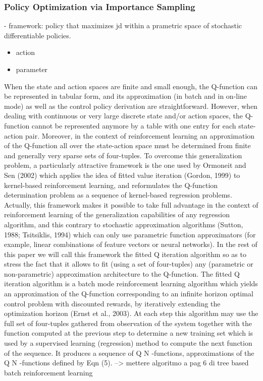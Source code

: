 \subsubsection{Policy Optimization via Importance Sampling}
\cite{pois}


- framework: policy that maximizes jd within a prametric space of stochastic differentiable policies.

\begin{itemize}
\item action
\item parameter
\end{itemize}




	When the state and action spaces are finite and small enough, the Q-function can be represented in tabular form, and its approximation (in batch and in on-line mode) as well as the control policy derivation are straightforward. However, when dealing with continuous or very large discrete state and/or action spaces, the Q-function cannot be represented anymore by a table with one entry for each state-action pair. Moreover, in the context of reinforcement learning an approximation of the Q-function all over the state-action space must be determined from finite and generally very sparse sets of four-tuples.
To overcome this generalization problem, a particularly attractive framework is the one used by Ormoneit and Sen (2002) which applies the idea of fitted value iteration (Gordon, 1999) to kernel-based reinforcement learning, and reformulates the Q-function determination problem as a sequence of kernel-based regression problems. Actually, this framework makes it possible to take full advantage in the context of reinforcement learning of the generalization capabilities of any regression algorithm, and this contrary to stochastic approximation algorithms (Sutton, 1988; Tsitsiklis, 1994) which can only use parametric function approximators (for example, linear combinations of feature vectors or neural networks). In the rest of this paper we will call this framework the fitted Q iteration
algorithm so as to stress the fact that it allows to fit (using a set of four-tuples) any (parametric or non-parametric) approximation architecture to the Q-function.
The fitted Q iteration algorithm is a batch mode reinforcement learning algorithm which yields an approximation of the Q-function corresponding to an infinite horizon optimal control problem with discounted rewards, by iteratively extending the optimization horizon (Ernst et al., 2003).
At each step this algorithm may use the full set of four-tuples gathered from observation of the system together with the function computed at the previous step to determine a new training set which is used by a supervised learning (regression) method to compute the next function of the sequence. It produces a sequence of Q N -functions, approximations of the Q N -functions defined by Eqn (5). --> mettere algoritmo a pag 6 di tree based batch reinforcement learning


